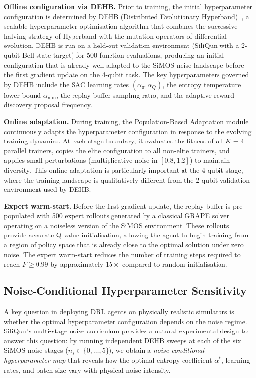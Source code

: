 \textbf{Offline configuration via DEHB.}
Prior to training, the initial hyperparameter configuration is determined by
DEHB (Distributed Evolutionary Hyperband)~\cite{Awad2021}, a scalable
hyperparameter optimisation algorithm that combines the successive halving
strategy of Hyperband with the mutation operators of differential evolution.
DEHB is run on a held-out validation environment (SiliQun with a 2-qubit Bell
state target) for 500 function evaluations, producing an initial configuration
that is already well-adapted to the SiMOS noise landscape before the first
gradient update on the 4-qubit task.
The key hyperparameters governed by DEHB include the SAC learning rates
$(\alpha_\pi, \alpha_Q)$, the entropy temperature lower bound $\alpha_\text{min}$,
the replay buffer sampling ratio, and the adaptive reward discovery proposal
frequency.

\textbf{Online adaptation.}
During training, the Population-Based Adaptation module continuously adapts the
hyperparameter configuration in response to the evolving training dynamics.
At each stage boundary, it evaluates the fitness of all $K = 4$ parallel
trainers, copies the elite configuration to all non-elite trainers, and applies
small perturbations (multiplicative noise in $[0.8, 1.2]$) to maintain diversity.
This online adaptation is particularly important at the 4-qubit stage, where the
training landscape is qualitatively different from the 2-qubit validation
environment used by DEHB.

\textbf{Expert warm-start.}
Before the first gradient update, the replay buffer is pre-populated with 500
expert rollouts generated by a classical GRAPE solver~\cite{Khaneja2005}
operating on a noiseless version of the SiMOS environment.
These rollouts provide accurate Q-value initialisation, allowing the agent to
begin training from a region of policy space that is already close to the optimal
solution under zero noise.
The expert warm-start reduces the number of training steps required to reach
$F \geq 0.99$ by approximately $15\times$ compared to random initialisation.

\subsection{Noise-Conditional Hyperparameter Sensitivity}
\label{subsec:noise_conditional_hp}

A key question in deploying DRL agents on physically realistic simulators is
whether the optimal hyperparameter configuration depends on the noise regime.
SiliQun's multi-stage noise curriculum provides a natural experimental design
to answer this question: by running independent DEHB sweeps at each of the
six SiMOS noise stages ($n_s \in \{0,\ldots,5\}$), we obtain a
\emph{noise-conditional hyperparameter map} that reveals how the optimal
entropy coefficient $\alpha^*$, learning rates, and batch size vary with
physical noise intensity.


